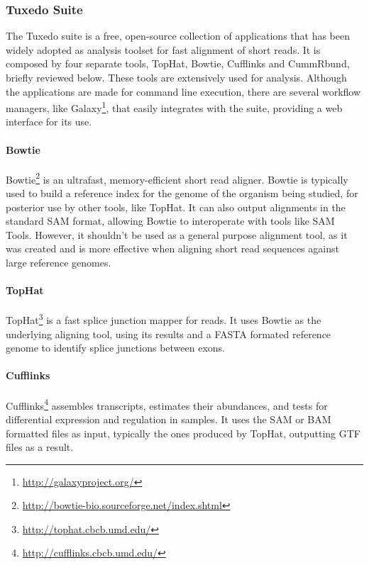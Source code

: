 \subsubsection*{Tuxedo Suite}

The Tuxedo suite is a free, open-source collection of applications that has been
widely adopted as analysis toolset for fast alignment of short reads. It is
composed by four separate tools, TopHat, Bowtie, Cufflinks and CummRbund,
briefly reviewed below. These tools are extensively used for \rnaseq{} analysis.
Although the applications are made for command line execution, there are several
workflow managers, like Galaxy\footnote{\url{http://galaxyproject.org/}}, that
easily integrates with the suite, providing a web interface for its use.

\paragraph{Bowtie}

Bowtie\footnote{\url{http://bowtie-bio.sourceforge.net/index.shtml}} is an
ultrafast, memory-efficient short read aligner. Bowtie is typically used to
build a reference index for the genome of the organism being studied, for
posterior use by other tools, like TopHat. It can also output alignments in the
standard SAM format, allowing Bowtie to interoperate with tools like SAM Tools.
However, it shouldn't be used as a general purpose alignment tool, as it was
created and is more effective when aligning short read sequences against large
reference genomes.

\paragraph{TopHat}

TopHat\footnote{\url{http://tophat.cbcb.umd.edu/}} is a fast splice junction
mapper for \rnaseq{} reads. It uses Bowtie as the underlying aligning tool,
using its results and a FASTA formated reference genome to identify splice
junctions between exons.

\paragraph{Cufflinks}

Cufflinks\footnote{\url{http://cufflinks.cbcb.umd.edu/}} assembles transcripts,
estimates their abundances, and tests for differential expression and regulation
in \rnaseq{} samples. It uses the SAM or BAM formatted files as input, typically
the ones produced by TopHat, outputting GTF files as a result.

